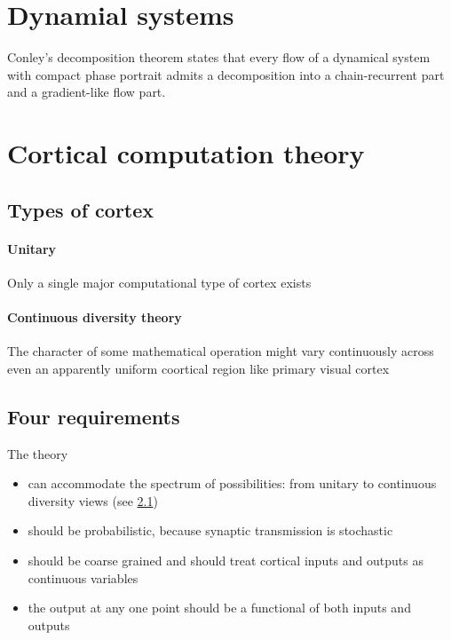 \documentclass{scrartcl}
\title{}
\author{\'Abel S\'agodi}
\date{September 1, 2023}
\theoremstyle{definition}
\theoremstyle{remark}
\begin{document}
\maketitle

\section{Dynamial systems}
Conley's decomposition theorem states that every flow of a dynamical system with compact phase portrait admits a decomposition into a chain-recurrent part and a gradient-like flow part.

\section{Cortical computation theory}
\citep{stevens1995}

\subsection{Types of cortex}\label{sec:types}
\paragraph{Unitary}
Only a single major computational type of cortex exists

\paragraph{Continuous diversity theory}
The character of some mathematical operation might vary continuously across even an apparently uniform coortical region like primary visual cortex



\subsection{Four requirements}
The theory 
\begin{itemize}
\item can accommodate the spectrum of possibilities: from unitary to continuous  diversity views (see \ref{sec:types})
\item should be probabilistic, because synaptic transmission is stochastic 
\item should be coarse grained and should treat cortical inputs and outputs as continuous variables
\item the output at any one point should be a functional of both inputs and outputs 
\end{itemize}
\end{document}
